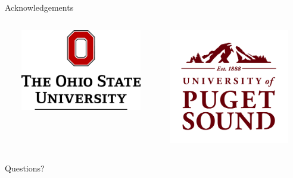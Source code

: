 \begin{frame}{Acknowledgements}
\begin{columns}[T,onlytextwidth]
\begin{minipage}[]{0.225\textwidth}
\end{minipage}%
\begin{minipage}[]{0.025\textwidth}
~
\end{minipage}%
\begin{minipage}[]{0.225\textwidth}
    \includegraphics[width = \textwidth]{images/OSU_Stacked_ScarletBlack}
\end{minipage}%
\begin{minipage}[]{0.025\textwidth}
~
\end{minipage}%
\begin{minipage}[]{0.225\textwidth}
    \includegraphics[width = \textwidth]{images/UofPS_stacked_maroonRGB_PNG}
\end{minipage}%
\begin{minipage}[]{0.0125\textwidth}
~
\end{minipage}%
\end{columns}
\end{frame}

\begin{frame}[standout]
  Questions?
\end{frame}